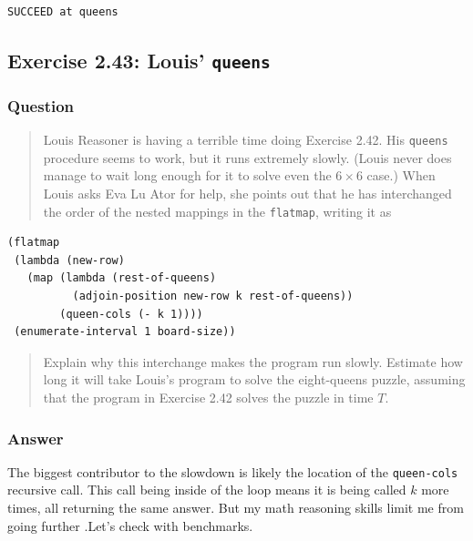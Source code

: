 \documentclass[final,fleqn,titlepage,twoside]{article}
\begin{document}
\begin{verbatim}
SUCCEED at queens
\end{verbatim}

\subsection{Exercise 2.43: Louis' \texttt{queens}}
\label{sec:org3f2d925}
\subsubsection{Question}
\label{sec:org262738c}
\begin{quote}
Louis Reasoner is having a terrible time doing Exercise 2.42. His
\texttt{queens} procedure seems to work, but it runs extremely slowly. (Louis
never does manage to wait long enough for it to solve even the \(6\times6\)
case.) When Louis asks Eva Lu Ator for help, she points out that he has
interchanged the order of the nested mappings in the \texttt{flatmap},
writing it as
\end{quote}

\begin{verbatim}
(flatmap
 (lambda (new-row)
   (map (lambda (rest-of-queens)
          (adjoin-position new-row k rest-of-queens))
        (queen-cols (- k 1))))
 (enumerate-interval 1 board-size))
\end{verbatim}

\begin{quote}
Explain why this interchange makes the program run slowly. Estimate how long it
will take Louis's program to solve the eight-queens puzzle, assuming that the
program in Exercise 2.42 solves the puzzle in time \(T\).
\end{quote}

\subsubsection{Answer}
\label{sec:org103ce02}
The biggest contributor to the slowdown is likely the location of the
\texttt{queen-cols} recursive call. This call being inside of the loop means
it is being called \(k\) more times, all returning the same answer. But my math reasoning skills limit me from going further .Let's check
with benchmarks.
\end{document}
